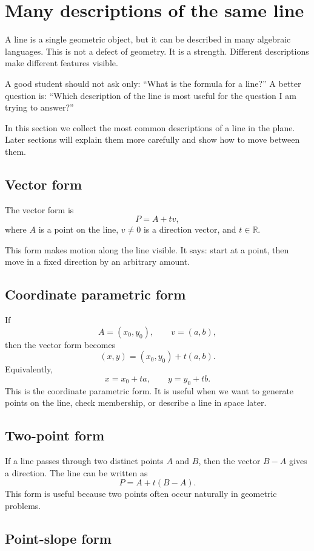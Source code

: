 \section{Many descriptions of the same line}

A line is a single geometric object, but it can be described in many algebraic languages. This is not a defect of geometry. It is a strength. Different descriptions make different features visible.

A good student should not ask only: ``What is the formula for a line?'' A better question is: ``Which description of the line is most useful for the question I am trying to answer?''

In this section we collect the most common descriptions of a line in the plane. Later sections will explain them more carefully and show how to move between them.

\subsection*{Vector form}

The vector form is
\[
P=A+t v,
\]
where \(A\) is a point on the line, \(v\ne0\) is a direction vector, and \(t\in\mathbb{R}\).

This form makes motion along the line visible. It says: start at a point, then move in a fixed direction by an arbitrary amount.

\subsection*{Coordinate parametric form}

If
\[
A=(x_0,y_0),
\qquad
v=(a,b),
\]
then the vector form becomes
\[
(x,y)=(x_0,y_0)+t(a,b).
\]
Equivalently,
\[
x=x_0+ta,
\qquad
y=y_0+tb.
\]
This is the coordinate parametric form. It is useful when we want to generate points on the line, check membership, or describe a line in space later.

\subsection*{Two-point form}

If a line passes through two distinct points \(A\) and \(B\), then the vector \(B-A\) gives a direction. The line can be written as
\[
P=A+t(B-A).
\]
This form is useful because two points often occur naturally in geometric problems.

\subsection*{Point-slope form}

